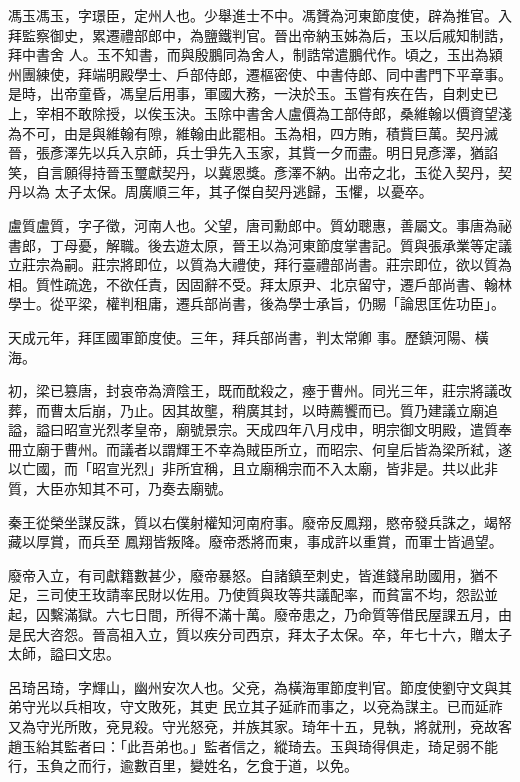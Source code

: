 \begin{pinyinscope}
 馮玉馮玉，字璟臣，定州人也。少舉進士不中。馮贇為河東節度使，辟為推官。入拜監察御史，累遷禮部郎中，為鹽鐵判官。晉出帝納玉姊為后，玉以后戚知制誥，拜中書舍
 人。玉不知書，而與殷鵬同為舍人，制誥常遣鵬代作。頃之，玉出為潁州團練使，拜端明殿學士、戶部侍郎，遷樞密使、中書侍郎、同中書門下平章事。是時，出帝童昏，馮皇后用事，軍國大務，一決於玉。玉嘗有疾在告，自刺史已上，宰相不敢除授，以俟玉決。玉除中書舍人盧價為工部侍郎，桑維翰以價資望淺為不可，由是與維翰有隙，維翰由此罷相。玉為相，四方賄，積貲巨萬。契丹滅晉，張彥澤先以兵入京師，兵士爭先入玉家，其貲一夕而盡。明日見彥澤，猶諂笑，自言願得持晉玉璽獻契丹，以冀恩獎。彥澤不納。出帝之北，玉從入契丹，契丹以為
 太子太保。周廣順三年，其子傑自契丹逃歸，玉懼，以憂卒。



 盧質盧質，字子徵，河南人也。父望，唐司勳郎中。質幼聰惠，善屬文。事唐為祕書郎，丁母憂，解職。後去遊太原，晉王以為河東節度掌書記。質與張承業等定議立莊宗為嗣。莊宗將即位，以質為大禮使，拜行臺禮部尚書。莊宗即位，欲以質為相。質性疏逸，不欲任責，因固辭不受。拜太原尹、北京留守，遷戶部尚書、翰林學士。從平梁，權判租庸，遷兵部尚書，後為學士承旨，仍賜「論思匡佐功臣」。



 天成元年，拜匡國軍節度使。三年，拜兵部尚書，判太常卿
 事。歷鎮河陽、橫海。



 初，梁已篡唐，封哀帝為濟陰王，既而酖殺之，瘞于曹州。同光三年，莊宗將議改葬，而曹太后崩，乃止。因其故壟，稍廣其封，以時薦饗而已。質乃建議立廟追謚，謚曰昭宣光烈孝皇帝，廟號景宗。天成四年八月戍申，明宗御文明殿，遣質奉冊立廟于曹州。而議者以謂輝王不幸為賊臣所立，而昭宗、何皇后皆為梁所弒，遂以亡國，而「昭宣光烈」非所宜稱，且立廟稱宗而不入太廟，皆非是。共以此非質，大臣亦知其不可，乃奏去廟號。



 秦王從榮坐謀反誅，質以右僕射權知河南府事。廢帝反鳳翔，愍帝發兵誅之，竭帑藏以厚賞，而兵至
 鳳翔皆叛降。廢帝悉將而東，事成許以重賞，而軍士皆過望。



 廢帝入立，有司獻籍數甚少，廢帝暴怒。自諸鎮至刺史，皆進錢帛助國用，猶不足，三司使王玫請率民財以佐用。乃使質與玫等共議配率，而貧富不均，怨訟並起，囚繫滿獄。六七日間，所得不滿十萬。廢帝患之，乃命質等借民屋課五月，由是民大咨怨。晉高祖入立，質以疾分司西京，拜太子太保。卒，年七十六，贈太子太師，謚曰文忠。



 呂琦呂琦，字輝山，幽州安次人也。父兗，為橫海軍節度判官。節度使劉守文與其弟守光以兵相攻，守文敗死，其吏
 民立其子延祚而事之，以兗為謀主。已而延祚又為守光所敗，兗見殺。守光怒兗，并族其家。琦年十五，見執，將就刑，兗故客趙玉紿其監者曰：「此吾弟也。」監者信之，縱琦去。玉與琦得俱走，琦足弱不能行，玉負之而行，逾數百里，變姓名，乞食于道，以免。




\end{pinyinscope}
